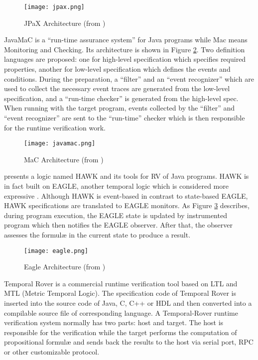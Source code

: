 \begin{figure}[h]
\begin{center}
\centering
\texttt{[image: jpax.png]}
\caption{JPaX Architecture (from \cite{havelund2001java})}
\label{img:jpax}
\end{center}
\end{figure}

JavaMaC \citep{kim2004java} is a ``run-time assurance system'' for Java programs while Mac means Monitoring and Checking. Its architecture is shown in Figure \ref{img:javamac}. Two definition languages are proposed: one for high-level specification which specifies required properties, another for low-level specification which defines the events and conditions. During the preparation, a ``filter'' and an ``event recognizer'' which are used to collect the necessary event traces are generated from the low-level specification, and a ``run-time checker'' is generated from the high-level spec. When running with the target program, events collected by the ``filter'' and ``event recognizer'' are sent to the ``run-time'' checker which is then responsible for the runtime verification work.

\begin{figure}[h]
\begin{center}
\centering
\texttt{[image: javamac.png]}
\caption{MaC Architecture (from \cite{kim2004java})}
\label{img:javamac}
\end{center}
\end{figure}

\cite{d2005event} presents a logic named HAWK and its tools for RV of Java programs. HAWK is in fact built on EAGLE, another temporal logic which is considered more expressive \citep{barringer2004rule}. Although HAWK is event-based in contrast to state-based EAGLE, HAWK specifications are translated to EAGLE monitors. As Figure \ref{img:eagle} describes, during program execution, the EAGLE state is updated by instrumented program which then notifies the EAGLE observer. After that, the observer assesses the formul\ae{} in the current state to produce a result. 

\begin{figure}[h]
\begin{center}
\centering
\texttt{[image: eagle.png]}
\caption{Eagle Architecture (from \cite{d2005event})}
\label{img:eagle}
\end{center}
\end{figure}

Temporal Rover \citep{drusinsky2000temporal} is a commercial runtime verification tool based on LTL and MTL (Metric Temporal Logic). The specification code of Temporal Rover is inserted into the source code of Java, C, C++ or HDL and then converted into a compilable source file of corresponding language. A Temporal-Rover runtime verification system normally has two parts: host and target. The host is responsible for the verification while the target performs the computation of propositional formul\ae{} and sends back the results to the host via serial port, RPC or other customizable protocol.

